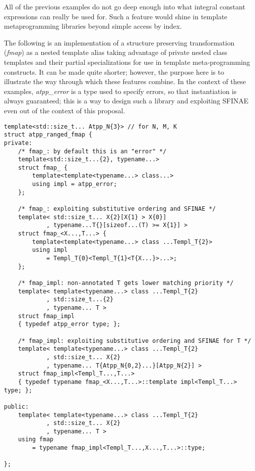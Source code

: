 \p All of the previous examples do not go deep enough into what integral constant expressions can really be used for.
Such a feature would shine in template metaprogramming libraries beyond simple access by index.

\p The following is an implementation of a structure preserving transformation (\textit{fmap}) as a nested template alias taking advantage of private nested class templates and their partial specializations for use in template meta-programming constructs.
It can be made quite shorter; however, the purpose here is to illustrate the way through which these features combine.
In the context of these examples, \textit{atpp\_error} is a type used to specify errors, so that instantiation is always guaranteed; this is a way to design such a library and exploiting SFINAE even out of the context of this proposal.

\begin{verbatim}
template<std::size_t... Atpp_N{3}> // for N, M, K
struct atpp_ranged_fmap {
private:
    /* fmap_: by default this is an "error" */
    template<std::size_t...{2}, typename...>
    struct fmap_ {
        template<template<typename...> class...>
        using impl = atpp_error;
    };
    
    /* fmap_: exploiting substitutive ordering and SFINAE */
    template< std::size_t... X{2}[X{1} > X{0}]
            , typename...T{}[sizeof...(T) >= X{1}] >
    struct fmap_<X...,T...> {
        template<template<typename...> class ...Templ_T{2}>
        using impl
            = Templ_T{0}<Templ_T{1}<T{X...}>...>;
    };
    
    /* fmap_impl: non-annotated T gets lower matching priority */
    template< template<typename...> class ...Templ_T{2}
            , std::size_t...{2}
            , typename... T >
    struct fmap_impl
    { typedef atpp_error type; };
    
    /* fmap_impl: exploiting substitutive ordering and SFINAE for T */
    template< template<typename...> class ...Templ_T{2}
            , std::size_t... X{2}
            , typename... T{Atpp_N{0,2}...}[Atpp_N{2}] >
    struct fmap_impl<Templ_T...,T...>
    { typedef typename fmap_<X...,T...>::template impl<Templ_T...> type; };

public:
    template< template<typename...> class ...Templ_T{2}
            , std::size_t... X{2}
            , typename... T >
    using fmap
        = typename fmap_impl<Templ_T...,X...,T...>::type;
    
};
\end{verbatim}

